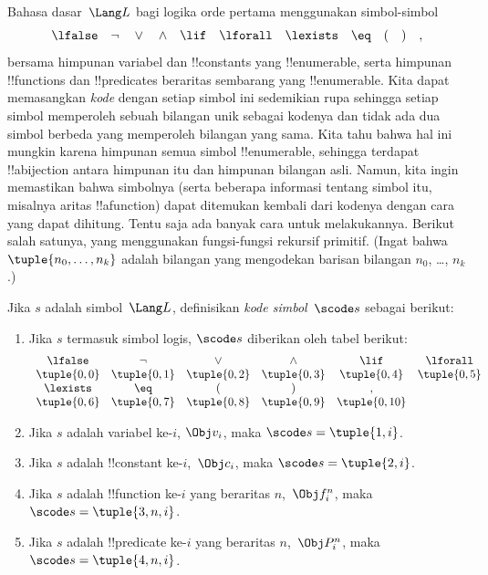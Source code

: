 \documentclass[../../../include/open-logic-section]{subfiles}
\begin{document}

Bahasa dasar~$\Lang L$ bagi logika orde pertama menggunakan simbol-simbol
\[
\lfalse \quad \lnot \quad \lor \quad \land \quad \lif \quad \lforall
\quad \lexists \quad \eq \quad ( \quad ) \quad ,
\]
bersama himpunan variabel dan !!{constant}s yang !!{enumerable}, serta
himpunan !!{function}s dan !!{predicate}s beraritas sembarang yang
!!{enumerable}. Kita dapat memasangkan \emph{kode}
dengan setiap simbol ini
sedemikian rupa sehingga setiap simbol memperoleh sebuah bilangan unik sebagai
kodenya dan tidak ada dua simbol berbeda yang memperoleh bilangan yang sama.
Kita tahu bahwa hal ini mungkin karena himpunan semua simbol !!{enumerable},
sehingga terdapat !!a{bijection} antara himpunan itu dan himpunan bilangan asli.
Namun, kita ingin memastikan bahwa simbolnya (serta beberapa informasi tentang
simbol itu, misalnya aritas !!a{function}) dapat ditemukan kembali dari kodenya
dengan cara yang dapat dihitung. Tentu saja ada banyak cara untuk melakukannya.
Berikut salah satunya, yang menggunakan fungsi-fungsi rekursif primitif.
(Ingat bahwa $\tuple{n_0, \dots, n_k}$ adalah bilangan yang mengodekan barisan
bilangan $n_0$, \dots, $n_k$.)

\begin{defn}
Jika $s$ adalah simbol~$\Lang L$, definisikan \emph{kode simbol}~$\scode s$
sebagai berikut:
\begin{enumerate}
\item Jika $s$ termasuk simbol logis, $\scode s$ diberikan oleh tabel berikut:
\[
\begin{array}{cccccccccc}
  \lfalse & \lnot & \lor & \land & \lif & \lforall \\
\tuple{0, 0} & \tuple{0, 1} & \tuple{0, 2} & \tuple{0, 3} &
\tuple{0, 4} & \tuple{0, 5} \\
\lexists & \eq & ( & ) & ,\\
\tuple{0, 6} & \tuple{0, 7} &
\tuple{0, 8} & \tuple{0, 9} & \tuple{0, 10}
\end{array}
\]
\item Jika $s$ adalah variabel ke-$i$, $\Obj v_i$, maka
  $\scode s = \tuple{1, i}$.
\item Jika $s$ adalah !!{constant} ke-$i$,~$\Obj c_i$, maka
  $\scode s = \tuple{2, i}$.
\item Jika $s$ adalah !!{function} ke-$i$ yang beraritas $n$,~$\Obj f_i^n$,
  maka $\scode s = \tuple{3, n, i}$.
\item Jika $s$ adalah !!{predicate} ke-$i$ yang beraritas $n$,~$\Obj P_i^n$,
  maka $\scode s = \tuple{4, n, i}$.
\end{enumerate}
\end{defn}
\end{document}
